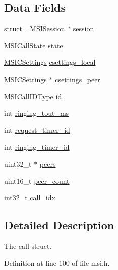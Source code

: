 \subsection*{Data Fields}
\begin{DoxyCompactItemize}
\item 
struct \hyperlink{struct___m_s_i_session}{\+\_\+\+M\+S\+I\+Session} $\ast$ \hyperlink{struct___m_s_i_call_ab8c2a41964c26c7f08f62fa440541b12}{session}
\item 
\hyperlink{msi_8h_afbc789bbdb9a4d00eda005500f7c1675}{M\+S\+I\+Call\+State} \hyperlink{struct___m_s_i_call_a4a1fc0e5d23dbdc357786d4c69eda9b9}{state}
\item 
\hyperlink{msi_8h_abe548d26a24458ebf9ab33310ee19600}{M\+S\+I\+C\+Settings} \hyperlink{struct___m_s_i_call_ae57cfc81fffd82f53953c6546bb9f3c3}{csettings\+\_\+local}
\item 
\hyperlink{msi_8h_abe548d26a24458ebf9ab33310ee19600}{M\+S\+I\+C\+Settings} $\ast$ \hyperlink{struct___m_s_i_call_a3b7fc70c2772bbdc453eeff763fc0b4c}{csettings\+\_\+peer}
\item 
\hyperlink{msi_8h_a861af5c5c180987c1c86739b4321076c}{M\+S\+I\+Call\+I\+D\+Type} \hyperlink{struct___m_s_i_call_aa135fbffd11268758f5f21269fb46853}{id}
\item 
int \hyperlink{struct___m_s_i_call_ad8fefcfbba597fbff4216644f2872acf}{ringing\+\_\+tout\+\_\+ms}
\item 
int \hyperlink{struct___m_s_i_call_a8ccfd1cd9f807007763f41eafd801130}{request\+\_\+timer\+\_\+id}
\item 
int \hyperlink{struct___m_s_i_call_a94fdc66dbd509ba4e89edcedb8e11022}{ringing\+\_\+timer\+\_\+id}
\item 
uint32\+\_\+t $\ast$ \hyperlink{struct___m_s_i_call_a55d2568491d616f7fef07bc7137c8c23}{peers}
\item 
uint16\+\_\+t \hyperlink{struct___m_s_i_call_a62e9da1e57f84fd224590c4d466724aa}{peer\+\_\+count}
\item 
int32\+\_\+t \hyperlink{struct___m_s_i_call_ad6b287fd08a0cc466cd41bd2e76d5808}{call\+\_\+idx}
\end{DoxyCompactItemize}


\subsection{Detailed Description}
The call struct. 

Definition at line 100 of file msi.\+h.



